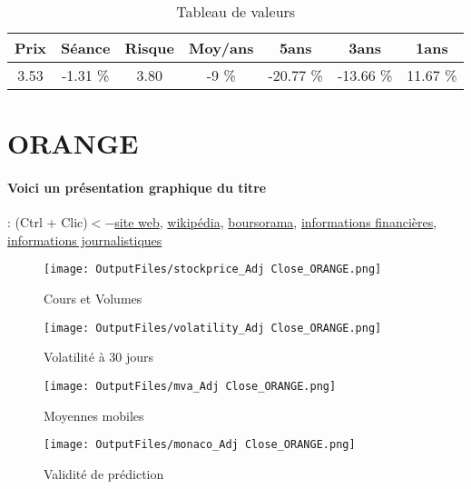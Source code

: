 \documentclass[11pt,a4paper]{report}%
\begin{document}
\begin{table}[H]
  \centering
    \begin{tabular}{|c|c|c|c|c|c|c|}
    \hline
    Prix & Séance & Risque  & Moy/ans & 5ans & 3ans & 1ans \\
    \hline
    3.53 &    -1.31 \%    & 3.80 & -9 \% & -20.77 \% & -13.66 \% & 11.67 \% \\
    \hline
    \end{tabular}%
        \label{tab:table_NOKIA}%
      \caption{Tableau de valeurs}
\end{table}%

\newpage

\section{ORANGE}

\paragraph{Voici un présentation graphique du titre} : (Ctrl + Clic)$<-$\href{https://www.orange.com/fr/derniers-resultats-consolides}{site web}, \href{https://fr.wikipedia.org/wiki/Orange_(entreprise)}{wikipédia}, \href{https://www.boursorama.com/cours/1rPORA}{boursorama}, \href{https://www.qwant.com/?q=site:https:%2f%2fwww.easybourse.com%2faction-societe%2fORANGE&t=web&client=ext-firefox-hp}{informations financières}, \href{https://bourse.lerevenu.com/cours-de-bourse/fiche-valeur-synthese/ORANGE/ORA-FR}{informations journalistiques}
\begin{figure}[!htb]
   \begin{minipage}{0.5\textwidth}
     \centering
     \texttt{[image: OutputFiles/stockprice\_Adj Close\_ORANGE.png]}
     \caption{Cours et Volumes}\label{Fig:price_ORANGE}
   \end{minipage}\hfill
   \begin{minipage}{0.5\textwidth}
     \centering
     \texttt{[image: OutputFiles/volatility\_Adj Close\_ORANGE.png]}
     \caption{Volatilité à 30 jours}\label{Fig:volat_ORANGE}
   \end{minipage}
\end{figure}
\begin{figure}[!htb]
   \begin{minipage}{0.5\textwidth}
     \centering
     \texttt{[image: OutputFiles/mva\_Adj Close\_ORANGE.png]}
     \caption{Moyennes mobiles}\label{Fig:mva_ORANGE}
   \end{minipage}\hfill
   \begin{minipage}{0.5\textwidth}
     \centering
     \texttt{[image: OutputFiles/monaco\_Adj Close\_ORANGE.png]}
     \caption{Validité de prédiction}\label{Fig:prediction_ORANGE}
   \end{minipage}
\end{figure}
\end{document}
